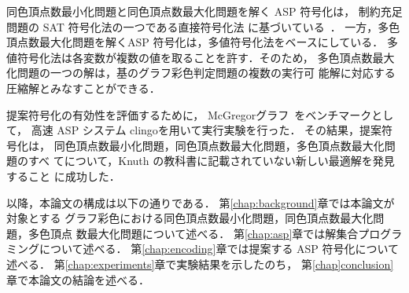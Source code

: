 同色頂点数最小化問題と同色頂点数最大化問題を解く ASP 符号化は，
制約充足問題の SAT 符号化法の一つである直接符号化法
に基づいている~\cite{JSAI:TamuraTB10}．
一方，多色頂点数最大化問題を解くASP 符号化は，多値符号化法をベースにしている．
多値符号化法は各変数が複数の値を取ることを許す．そのため，
多色頂点数最大化問題の一つの解は，基のグラフ彩色判定問題の複数の実行可
能解に対応する圧縮解とみなすことができる．

提案符号化の有効性を評価するために，
\textsf{McGregor}グラフ~\cite{Knuth:TAOCP:SAT}をベンチマークとして，
高速 ASP システム \textsf{clingo}を用いて実行実験を行った．
その結果，提案符号化は，
同色頂点数最小化問題，同色頂点数最大化問題，多色頂点数最大化問題のすべ
てについて，Knuth の教科書に記載されていない新しい最適解を発見すること
に成功した．




以降，本論文の構成は以下の通りである．
第\ref{chap:background}章では本論文が対象とする
グラフ彩色における同色頂点数最小化問題，同色頂点数最大化問題，多色頂点
数最大化問題について述べる．
第\ref{chap:asp}章では解集合プログラミングについて述べる．
第\ref{chap:encoding}章では提案する ASP 符号化について述べる．
第\ref{chap:experiments}章で実験結果を示したのち，
第\ref{chap]conclusion}章で本論文の結論を述べる．

